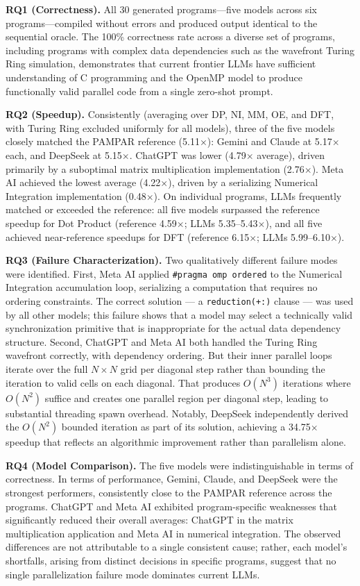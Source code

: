 \documentclass[conference]{IEEEtran}
\begin{document}
\textbf{RQ1 (Correctness).} All 30 generated programs—five models across six programs—compiled without errors and produced output identical to the sequential oracle. 
The 100\% correctness rate across a diverse set of programs, including programs with complex data dependencies such as the wavefront Turing Ring simulation, demonstrates that current frontier LLMs have sufficient understanding of C programming and the OpenMP model to produce functionally valid parallel code from a single zero-shot prompt.

\textbf{RQ2 (Speedup).} Consistently (averaging over DP, NI, MM, OE, and DFT, with Turing Ring excluded uniformly for all models), three of the five models closely matched the PAMPAR reference (5.11$\times$): Gemini and Claude at 5.17$\times$ each, and DeepSeek at 5.15$\times$. ChatGPT was lower (4.79$\times$ average), driven primarily by a suboptimal matrix multiplication implementation (2.76$\times$). 
Meta AI achieved the lowest average (4.22$\times$), driven by a serializing Numerical Integration implementation (0.48$\times$). 
On individual programs, LLMs frequently matched or exceeded the reference: all five models surpassed the reference speedup for Dot Product (reference 4.59$\times$; LLMs 5.35--5.43$\times$), and all five achieved near-reference speedups for DFT (reference 6.15$\times$; LLMs 5.99--6.10$\times$).

\textbf{RQ3 (Failure Characterization).} Two qualitatively different failure modes were identified. 
First, Meta AI applied \texttt{\#pragma omp ordered} to the Numerical Integration accumulation loop, serializing a computation that requires no ordering constraints. 
The correct solution — a \texttt{reduction(+:)} clause — was used by all other models; this failure shows that a model may select a technically valid synchronization primitive that is inappropriate for the actual data dependency structure. 
Second, ChatGPT and Meta AI both handled the Turing Ring wavefront correctly, with dependency ordering.
But their inner parallel loops iterate over the full $N \times N$ grid per diagonal step rather than bounding the iteration to valid cells on each diagonal. 
That produces $O(N^3)$ iterations where $O(N^2)$ suffice and creates one parallel region per diagonal step, leading to substantial threading spawn overhead. 
Notably, DeepSeek independently derived the $O(N^2)$ bounded iteration as part of its solution, achieving a 34.75$\times$ speedup that reflects an algorithmic improvement rather than parallelism alone.

\textbf{RQ4 (Model Comparison).} The five models were indistinguishable in terms of correctness. In terms of performance, Gemini, Claude, and DeepSeek were the strongest performers, consistently close to the PAMPAR reference across the programs. 
ChatGPT and Meta AI exhibited program-specific weaknesses that significantly reduced their overall averages: ChatGPT in the matrix multiplication application and Meta AI in numerical integration. 
The observed differences are not attributable to a single consistent cause; rather, each model's shortfalls, arising from distinct decisions in specific programs, suggest that no single parallelization failure mode dominates current LLMs.
\end{document}
